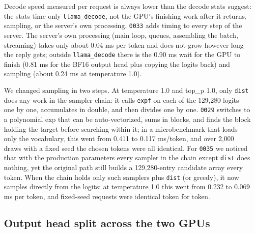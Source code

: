 \documentclass[11pt,a4paper]{article}
\newcommand{\code}[1]{\texttt{#1}}
\begin{document}
Decode speed measured per request is always lower than the decode stats suggest: the stats time only \code{llama\_decode}, not the GPU's finishing work after it returns, sampling, or the server's own processing. \code{0033} adds timing to every step of the server. The server's own processing (main loop, queues, assembling the batch, streaming) takes only about 0.04 ms per token and does not grow however long the reply gets; outside \code{llama\_decode} there is the 0.90 ms wait for the GPU to finish (0.81 ms for the BF16 output head plus copying the logits back) and sampling (about 0.24 ms at temperature 1.0).

We changed sampling in two steps. At temperature 1.0 and top\_p 1.0, only \code{dist} does any work in the sampler chain: it calls \code{expf} on each of the 129,280 logits one by one, accumulates in double, and then divides one by one. \code{0029} switches to a polynomial exp that can be auto-vectorized, sums in blocks, and finds the block holding the target before searching within it; in a microbenchmark that loads only the vocabulary, this went from 0.411 to 0.117 ms/token, and over 2,000 draws with a fixed seed the chosen tokens were all identical. For \code{0035} we noticed that with the production parameters every sampler in the chain except \code{dist} does nothing, yet the original path still builds a 129,280-entry candidate array every token. When the chain holds only such samplers plus \code{dist} (or greedy), it now samples directly from the logits: at temperature 1.0 this went from 0.232 to 0.069 ms per token, and fixed-seed requests were identical token for token.

\subsection{Output head split across the two GPUs}
\label{sec:headsplit}
\end{document}
